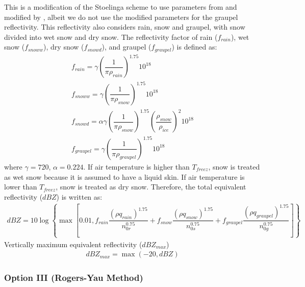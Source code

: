 \documentclass[letterpaper,titlepage,10pt]{article}
\numberwithin{equation}{section}
\begin{document}
This is a modification of the Stoelinga scheme to use parameters from \citet{smith1975rada} and modified by \citet{tong2005ense}, albeit we do not use the modified parameters for the graupel reflectivity. This reflectivity also considers rain, snow and graupel, with snow divided into wet snow and dry snow. The reflectivity factor of rain ($f_{rain}$), wet snow ($f_{snoww}$), dry snow ($f_{snowd}$), and graupel ($f_{graupel}$) is defined as:
\begin{gather}
	f_{rain} = \gamma \left(\dfrac{1}{\pi \rho_{rain}} \right)^{1.75} 10^{18} \\
	f_{snoww} = \gamma \left(\dfrac{1}{\pi \rho_{snow}} \right)^{1.75} 10^{18} \\
	f_{snowd} = \alpha \gamma \left(\dfrac{1}{\pi \rho_{snow}} \right)^{1.75} \left(\dfrac{\rho_{snow}}{\rho_{ice}} \right)^2 10^{18} \\
	f_{graupel} = \gamma \left(\dfrac{1}{\pi \rho_{graupel}} \right)^{1.75} 10^{18}
\end{gather}
where $\gamma = 720$, $\alpha = 0.224$. If air temperature is higher than $T_{freez}$, snow is treated as wet snow because it is assumed to have a liquid skin. If air temperature is lower than $T_{freez}$, snow is treated as dry snow. Therefore, the total equivalent reflectivity ($dBZ$) is written as:
\begin{gather}
	dBZ = 10 \log \left\{\max \left[0.01, f_{rain} \dfrac{\left(\rho q_{rain} \right)^{1.75}}{n_{0r}^{0.75}} + f_{snow} \dfrac{\left(\rho q_{snow} \right)^{1.75}}{n_{0s}^{0.75}} + f_{graupel} \dfrac{\left(\rho q_{graupel} \right)^{1.75}}{n_{0g}^{0.75}} \right] \right\}
\end{gather}
Vertically maximum equivalent reflectivity ($dBZ_{max}$)
\begin{gather}
	dBZ_{max} = \max \left(-20, dBZ \right)
\end{gather}


\subsubsection*{Option III (Rogers-Yau Method)}
\end{document}
